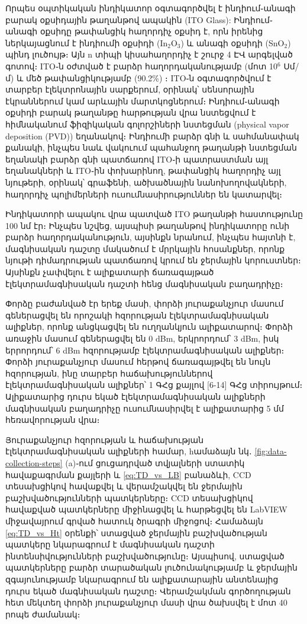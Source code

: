 \documentclass[12pt, fleqn]{report}
\begin{document}
Որպես օպտիկական ինդիկատոր օգտագործվել է ինդիում֊անագի բարակ օքսիդային թաղանթով ապակին (ITO Glass): Ինդիում֊անագի օքսիդը թափանցիկ հաղորդիչ օքսիդ է, որն իրենից ներկայացնում է ինդիումի օքսիդի (In$_2$O$_3$) և անագի օքսիդի (SnO$_2$) պինդ լուծույթ։ Այն n տիպի կիսահաղորդիչ է շուրջ 4 ԷՎ արգելված գոտով։ ITO֊ն օժտված է բարձր հաղորդականությամբ (մոտ 10$^6$ Սմ/մ) և մեծ թափանցիկությամբ (90.2\%) \cite{chen2013itofabcrication}։ ITO֊ն օգտագործվում է տարբեր էլեկտրոնային սարքերում, օրինակ՝ սենսորային էկրաններում կամ արևային մարտկոցներում։ Ինդիում֊անագի օքսիդի բարակ թաղանթը հարթության վրա նստեցվում է հիմնականում ֆիզիկական գոլորշիների նստեցման (physical vapor deposition (PVD)) եղանակով։ Ինդիումի բարձր գնի և սահմանափակ քանակի, ինչպես նաև վակուում պահանջող թաղանթի նստեցման եղանակի բարձր գնի պատճառով ITO֊ի պատրաստման այլ եղանակների և ITO֊ին փոխարինող, թափանցիկ հաղորդիչ այլ նյութերի, օրինակ՝ գրաֆենի, ածխածնային նանոխողովակների, հաղորդիչ պոլիմերների ուսումնասիրություններ են կատարվել։

Ինդիկատորի ապակու վրա պատված ITO թաղանթի հաստությունը 100 նմ էր։  Ինչպես նշվեց, այսպիսի թաղանթով ինդիկատորը ունի բարձր հաղորդականություն, այսինքն նրանում, ինչպես հայտնի է, մագնիսական դաշտը մակածում է մրրկային հոսանքներ, որոնք նյութի դիմադրության պատճառով կրում են ջերմային կորուստներ։ Այսինքն չափվելու է ալիքատարի ճառագայթած  էլեկտրամագնիսական դաշտի հենց մագնիսական բաղադրիչը։

Փորձը բաժանված էր երեք մասի, փորձի յուրաքանչյուր մասում գեներացվել են որոշակի հզորության էլեկտրամագնիսական ալիքներ, որոնք անցկացվել են ուղղանկյուն ալիքատարով։ Փորձի առաջին մասում գեներացվել են 0 dBm, երկրորդում՝ 3 dBm, իսկ երրորդում՝ 6 dBm հզորությամբ էլեկտրամագնիսական ալիքներ։ Փորձի յուրաքանչյուր մասում հերթով ճառագայթվել են նույն հզորության, ինը տարբեր հաճախություններով էլեկտրամագնիսական ալիքներ՝ 1 ԳՀց քայլով [6-14] ԳՀց տիրույթում։ Ալիքատարից դուրս եկած էլեկտրամագնիսական ալիքների մագնիսական բաղադրիչը ուսումնասիրվել է ալիքատարից 5 մմ հեռավորության վրա։

Յուրաքանչյուր հզորության և հաճախության էլեկտրամագնիսական ալիքների համար, hամաձայն նկ․ \ref{fig:data-collection-steps} (a)֊ում ցուցադրված տվյալների ստատիկ հավաքագրման քայլերի և \eqref{eq:TD_vs_LB} բանաձևի, CCD տեսախցիկով հավաքվել և վերամշակվել են ջերմային բաշխվածությունների պատկերները։ CCD տեսախցիկով հավաքված պատկերները միջինացվել և հարթեցվել են LabVIEW միջավայրում գրված հատուկ ծրագրի միջոցով։ Համաձայն \eqref{eq:TD_vs_Ht} օրենքի՝ ստացված ջերմային բաշխվածության պատկերը նկարագրում է մագնիսական դաշտի ինտենսիվությունների բաշխվածությունը։ Այսպիսով, ստացված պատկերները բարձր տարածական լուծունակությամբ և ջերմային զգայունությամբ նկարագրում են ալիքատարային անտենայից դուրս եկած մագնիսական դաշտը։ Վերամշակման գործողության հետ մեկտեղ փորձի յուրաքանչյուր մասի վրա ծախսվել է մոտ 40 րոպե ժամանակ։
\end{document}

